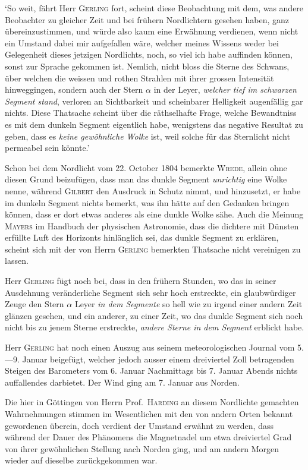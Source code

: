 ‘So weit, fährt Herr \textsc{Gerling} fort, scheint diese Beobachtung mit dem, was andere Beobachter zu gleicher Zeit und bei frühern Nordlichtern gesehen haben, ganz übereinzustimmen, und würde also kaum eine Erwähnung verdienen, wenn nicht ein Umstand dabei mir aufgefallen wäre, welcher meines Wissens weder bei Gelegenheit dieses jetzigen Nordlichts, noch, so viel ich habe auffinden können, sonst zur Sprache gekommen ist. Nemlich, nicht bloss die Sterne des Schwans, über welchen die weissen und rothen Strahlen mit ihrer grossen Intensität hinweggingen, sondern auch der Stern $\alpha$ in der Leyer, \textit{welcher tief im schwarzen Segment stand}, verloren an Sichtbarkeit und scheinbarer Helligkeit augenfällig gar nichts. Diese Thatsache scheint über die räthselhafte Frage, welche Bewandtniss es mit dem dunkeln Segment eigentlich habe, wenigstens das negative Resultat zu geben, dass es \textit{keine gewöhnliche Wolke} ist, weil solche für das Sternlicht nicht permeabel sein könnte.’

Schon bei dem Nordlicht vom 22. October 1804 bemerkte \textsc{Wrede}, allein ohne diesen Grund beizufügen, dass man das dunkle Segment \textit{unrichtig} eine Wolke nenne, während \textsc{Gilbert} den Ausdruck in Schutz nimmt, und hinzusetzt, er habe im dunkeln Segment nichts bemerkt, was ihn hätte auf den Gedanken bringen können, dass er dort etwas anderes als eine dunkle Wolke sähe. Auch die Meinung \textsc{Mayers} im Handbuch der physischen Astronomie, dass die dichtere mit Dünsten erfüllte Luft des Horizonts hinlänglich sei, das dunkle Segment zu erklären, scheint sich mit der von Herrn \textsc{Gerling} bemerkten Thatsache nicht vereinigen zu lassen.

Herr \textsc{Gerling} fügt noch bei, dass in den frühern Stunden, wo das in seiner Ausdehnung veränderliche Segment sich sehr hoch erstreckte, ein glaubwürdiger Zeuge den Stern $\alpha$ Leyer \textit{in dem Segmente} so hell wie zu irgend einer andern Zeit glänzen gesehen, und ein anderer, zu einer Zeit, wo das dunkle Segment sich noch nicht bis zu jenem Sterne erstreckte, \textit{andere Sterne in dem Segment} erblickt habe.

Herr \textsc{Gerling} hat noch einen Auszug aus seinem meteorologischen Journal vom 5.—9. Januar beigefügt, welcher jedoch ausser einem dreiviertel Zoll betragenden Steigen des Barometers vom 6. Januar Nachmittags bis 7. Januar Abends nichts auffallendes darbietet. Der Wind ging am 7. Januar aus Norden.

Die hier in Göttingen von Herrn Prof.\ \textsc{Harding} an diesem Nordlichte gemachten Wahrnehmungen stimmen im Wesentlichen mit den von andern Orten bekannt gewordenen überein, doch verdient der Umstand erwähnt zu werden, dass während der Dauer des Phänomens die Magnetnadel um etwa dreiviertel Grad von ihrer gewöhnlichen Stellung nach Norden ging, und am andern Morgen wieder auf dieselbe zurückgekommen war.

